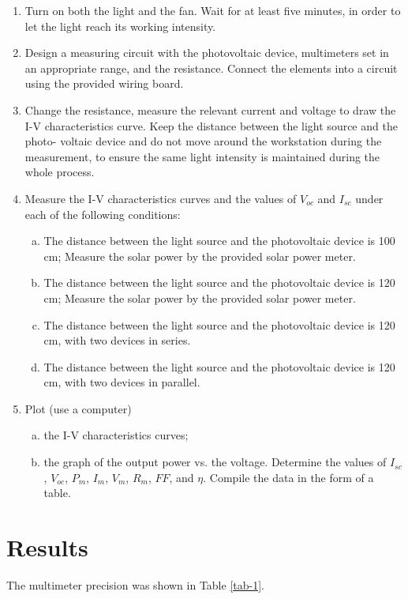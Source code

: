 \documentclass{article}
\begin{document}
{{\begin{enumerate}
\item
Turn on both the light and the fan. Wait for at least five minutes, in order to let
the light reach its working intensity.
\item
Design a measuring circuit with the photovoltaic device, multimeters set in an appropriate range, and the resistance. Connect the elements into a circuit using the
provided wiring board.
\item
Change the resistance, measure the relevant current and voltage to draw the I-V
characteristics curve. Keep the distance between the light source and the photo-
voltaic device and do not move around the workstation during the measurement, to
ensure the same light intensity is maintained during the whole process.
\item
Measure the I-V characteristics curves and the values of $V_{oc}$ and $I_{sc}$ under each of the following conditions:
\begin{enumerate}[(a)]
\item
The distance between the light source and the photovoltaic device is 100 cm;
Measure the solar power by the provided solar power meter.
\item
The distance between the light source and the photovoltaic device is 120 cm;
Measure the solar power by the provided solar power meter.
\item
The distance between the light source and the photovoltaic device is 120 cm,
with two devices in series.
\item
The distance between the light source and the photovoltaic device is 120 cm,
with two devices in parallel.
\end{enumerate}
\item
Plot (use a computer)
\begin{enumerate}[(a)]
\item
the I-V characteristics curves;
\item
the graph of the output power vs. the voltage. Determine the values of
$I_{sc}$, $V_{oc}$, $P_m$, $I_m$, $V_m$, $R_m$, $FF$, and $\eta$. Compile the data in the form of a table.
\end{enumerate}
\end{enumerate}


\section{Results}

The multimeter precision was shown in Table \ref{tab-1}.

}}
\end{document}
